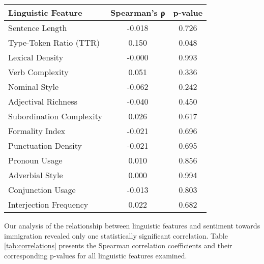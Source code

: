 \documentclass[11pt]{article}
\begin{document}
\begin{table*}[ht!]
        \centering
        \begin{tabular}{lcc}
                \hline
                \textbf{Linguistic Feature} & \textbf{Spearman's ρ} & \textbf{p-value} \\
                \hline
                Sentence Length             & -0.018                & 0.726            \\
                Type-Token Ratio (TTR)      & 0.150                 & 0.048            \\
                Lexical Density             & -0.000                & 0.993            \\
                Verb Complexity             & 0.051                 & 0.336            \\
                Nominal Style               & -0.062                & 0.242            \\
                Adjectival Richness         & -0.040                & 0.450            \\
                Subordination Complexity    & 0.026                 & 0.617            \\
                Formality Index             & -0.021                & 0.696            \\
                Punctuation Density         & -0.021                & 0.695            \\
                Pronoun Usage               & 0.010                 & 0.856            \\
                Adverbial Style             & 0.000                 & 0.994            \\
                Conjunction Usage           & -0.013                & 0.803            \\
                Interjection Frequency      & 0.022                 & 0.682            \\
                \hline
        \end{tabular}
        \caption{Spearman correlation coefficients and p-values for
                linguistic features with sentiment towards immigration. Only Type-Token Ratio (TTR) shows a significant correlation with immigration sentiment (p < 0.05).}
        \label{tab:correlations}
\end{table*}

Our analysis of the relationship between linguistic features and sentiment towards immigration revealed only one statistically significant correlation.
Table \ref{tab:correlations} presents the Spearman correlation coefficients and their corresponding p-values for all linguistic features examined.
\end{document}
